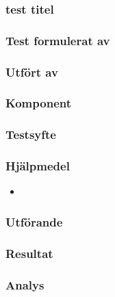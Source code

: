 \subsubsection{test titel}
\label{test:uinikIdentifiering}

\setlength{\columnsep}{1cm}




\begin{multicols}{2}
\subsubsection*{Test formulerat av}


\subsubsection*{Utfört av}



\end{multicols}
\subsubsection*{Komponent}



\subsubsection*{Testsyfte}



\subsubsection*{Hjälpmedel}
\begin{itemize}
	\item 
\end{itemize}



\subsubsection*{Utförande}



\subsubsection*{Resultat}



\subsubsection*{Analys}



